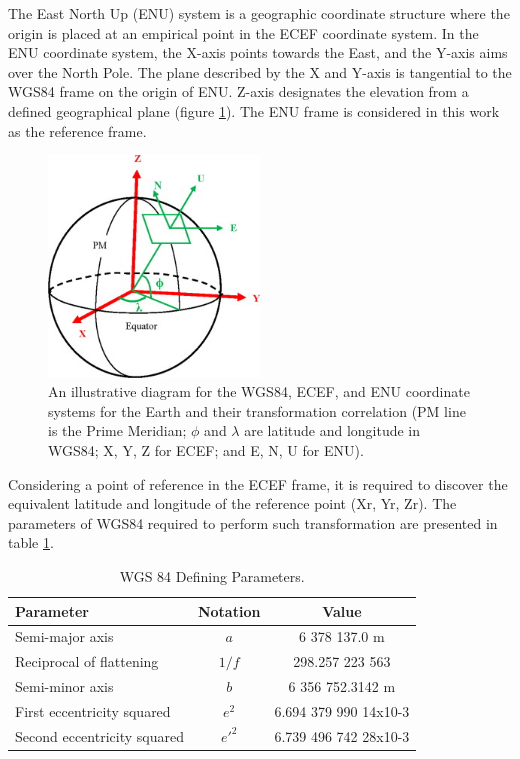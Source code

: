 The East North Up (ENU) system is a geographic coordinate structure where the origin is placed at an empirical point in the ECEF coordinate system.  In the ENU coordinate system, the X-axis points towards the East, and the Y-axis aims over the North Pole. The plane described by the X and Y-axis is tangential to the WGS84 frame on the origin of ENU. Z-axis designates the elevation from a defined geographical plane (figure \ref{fig:ECEF}). The ENU frame is considered in this work as the reference frame.

\begin{figure}[H]
    \centering
    \includegraphics[width=0.5\textwidth]{figures/ECEF.jpg}
    \caption{An illustrative diagram for the WGS84, ECEF, and ENU coordinate systems for the Earth and their transformation correlation (PM line is the Prime Meridian; $\phi$ and $\lambda$ are latitude and longitude in WGS84; X, Y, Z for ECEF; and E, N, U for ENU).  }
    \label{fig:ECEF}
\end{figure}

Considering a point of reference in the ECEF frame, it is required to discover the equivalent latitude and longitude of the reference point (Xr, Yr, Zr). The parameters of WGS84 required to perform such transformation are presented in table \ref{tab:WGS}.

\begin{table}[H]
    \begin{center}
        \begin{tabular}[t]{lcc}
            \hline
            Parameter                   & Notation & Value                 \\
            \hline
            Semi-major axis             & $a$      & 6 378 137.0 m
            \\
            Reciprocal of flattening    & $1/f$    & 298.257 223 563
            \\
            Semi-minor axis             & $b$      & 6 356 752.3142 m      \\
            First eccentricity squared  & $e^2$    & 6.694 379 990 14x10-3 \\
            Second eccentricity squared & $e'^{2}$ & 6.739 496 742 28x10-3 \\
            \hline
        \end{tabular}
        \caption{WGS 84 Defining Parameters.}
        \label{tab:WGS}
    \end{center}
\end{table}

